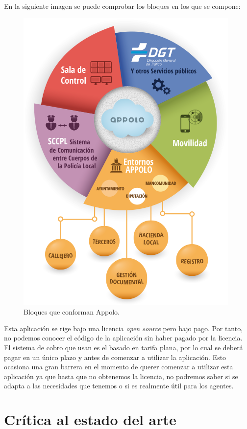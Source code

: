 En la siguiente imagen se puede comprobar los bloques en los que se compone:

\begin{figure}[H]
	\centering
	\includegraphics[scale=0.55]{imagenes/appolo-info.png}
	\caption{Bloques que conforman Appolo.\cite{appolo} \label{fig:figura15}}
\end{figure}

Esta aplicación se rige bajo una licencia \textit{open source} pero bajo pago. Por tanto, no podemos conocer el código de la aplicación
sin haber pagado por la licencia. El sistema de cobro que usan es el basado en tarifa plana, por lo cual se deberá pagar en un
único plazo y antes de comenzar a utilizar la aplicación. Esto ocasiona una gran barrera en el momento de querer comenzar a utilizar esta aplicación ya que hasta que no obtenemos la licencia, no podremos saber si se adapta a las necesidades que tenemos o si es realmente útil para los agentes.

\section{Crítica al estado del arte}

